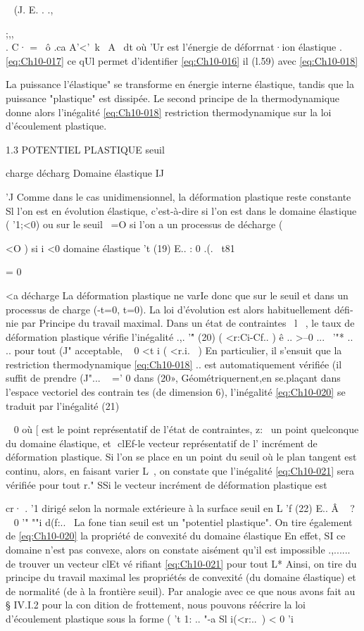 ~
(J. E. . .,{;,,\\. C· = 
~ô .ca A'<'~k~ A~ dt 
où 'Ur est l'énergie de déforrnat·ion élastique . \eqref{eq:Ch10-017} 
ce qUl permet d'identifier \eqref{eq:Ch10-016} il (l.59) avec 
\eqref{eq:Ch10-018} 

La puissance l'élastique" se transforme en énergie interne élastique, tandis que la puissance "plastique" est dissipée. Le second principe de la thermo­dynamique donne alors l'inégalité 
\eqref{eq:Ch10-018} 
restriction thermodynamique sur la loi d'écoulement plastique. 


1.3 POTENTIEL PLASTIQUE 
seuil 

charge
décharg Domaine 
élastique 
IJ 

'J 
Comme dans le cas unidimensionnel, la déformation plastique reste constante Sl l'on est en évolution élastique, c'est-à-dire si l'on est dans le domai­ne élastique ( '1;<0) ou sur le seuil ~=O si l'on a un processus de dé­charge ( {<O ) 
si i <0 domaine élastique
't
(19) 	E.. : 0 .(.~ t81 {= 0 {<a décharge 
La déformation plastique ne varIe donc que sur le seuil et dans un processus 
de charge (-t=0, t=0). La loi d'évolution est alors habituellement défi­
nie par 
Principe du travail maximal. Dans un état de contraintes ~l~ , le taux de 
déformation plastique vérifie l'inégalité 
.,. 
'"\'­
(20) 	( <r:Ci-Cf.. ) ê .. >--0 
...~
'"* 
.. 	.. 
pour tout (J" acceptable, ~ 0
<t 	i ( <r.i.~ ) 
En particulier, il s'ensuit que la restriction thermodynamique \eqref{eq:Ch10-018} 
.. 
est automatiquement vérifiée (il suffit de prendre (J"... ~ =' 0 dans (20», 
Géométriquernent,en se.plaçant dans l'espace vectoriel des contrain­
tes (de dimension 6), l'inégalité \eqref{eq:Ch10-020} se traduit par l'inégalité 
(21) 

~ 0 
où [ est le point représentatif de l'état de contraintes, z:~ un point quel­conque du domaine élastique, et ­
clEf-le vecteur représentatif de l' incré­ment de déformation plastique. 
Si l'on se place en un point du seuil où le plan tangent est conti­nu, alors, en faisant varier L~, on constate que l'inégalité \eqref{eq:Ch10-021} sera vé­rifiée pour tout r." SSi le vecteur incrément de déformation plastique est 

cr· .
'1 
dirigé selon la normale extérieure à la surface seuil en L 
'f­
(22) 
E.. Â 	~ ? ~ 0
'" 
""i d(f:..~ 
La fone tian seuil est un "potentiel plastique". On tire également de \eqref{eq:Ch10-020} la propriété de convexité du domaine élastique 
En effet, SI ce domaine n'est 
pas convexe, alors on constate aisément qu'il est impossible 
.,...... de trouver un vecteur clEt vé­
rifiant \eqref{eq:Ch10-021} pour tout L* 
Ainsi, on tire du principe du travail maximal les propriétés de convexité 
(du domaine élastique) et de normalité (de à la frontière seuil). 
Par analogie avec ce que nous avons fait au § IV.I.2 pour la con­
dition de frottement, nous pouvons réécrire la loi d'écoulement plastique 
sous la forme 
( 
't
1: .. "-a Sl i(<r:..~) < 0 
'i

}}}}

